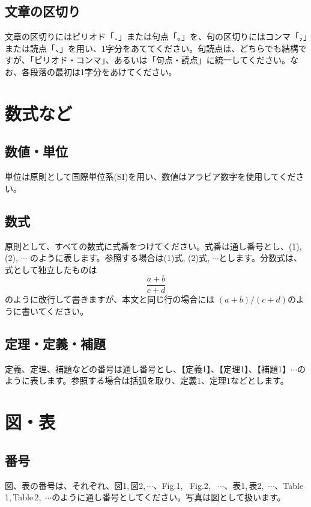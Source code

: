 \documentclass{hissymp}
\begin{document}
\subsection{文章の区切り}
文章の区切りにはピリオド「．」または句点「。」を、句の区切りにはコンマ「，」または読点「、」を用い、1字分をあててください。句読点は、どちらでも結構ですが、「ピリオド・コンマ」、あるいは「句点・読点」に統一してください。なお、各段落の最初は1字分をあけてください。


\section{数式など}

\subsection{数値・単位}
単位は原則として国際単位系(SI)を用い、数値はアラビア数字を使用してください。

\subsection{数式}
原則として、すべての数式に式番をつけてください。式番は通し番号とし、(1), (2), $ \cdots $ のように表します。参照する場合は(1)式, (2)式, $ \cdots $とします。分数式は、式として独立したものは
\begin{equation}
	\frac{a+b}{c+d}
	\label{formula}
\end{equation}
のように改行して書きますが、本文と同じ行の場合には $ (a+b) / (c+d) $のように書いてください。

\subsection{定理・定義・補題}
定義、定理、補題などの番号は通し番号とし、【定義1】、【定理1】、【補題1】$ \cdots $のように表します。参照する場合は括弧を取り、定義1、定理1などとします。


\section{図・表}

\subsection{番号}
図、表の番号は、それぞれ、図1,\,図2,\,$ \cdots $、Fig.1, \, Fig.2, \, $ \cdots $、表1,\,表2,\, $ \cdots $、Table\,1,\,Table\,2,\, $ \cdots $のように通し番号としてください。写真は図として扱います。
\end{document}
